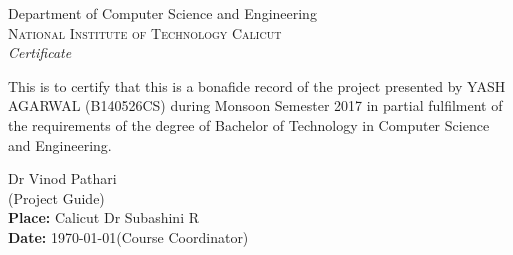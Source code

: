 \newpage
\thispagestyle{empty}

\begin{center}

\huge{Department of Computer Science and Engineering}\\[0.5cm]
\normalsize
\textsc{National Institute of Technology Calicut}\\[2.0cm]

\emph{\LARGE Certificate}\\[2.5cm]
\end{center}
\normalsize This is to certify that this is a bonafide record of the project presented by YASH AGARWAL (B140526CS) during Monsoon Semester 2017 in partial fulfilment of the requirements of the degree of Bachelor of Technology in Computer Science and Engineering.\\[1.0cm]

\begin{flushright}
Dr Vinod Pathari\\
(Project Guide)\\[1.5cm]
\textbf {Place:} Calicut \hfill Dr Subashini R\\
\textbf {Date:} \today \hfill (Course Coordinator)
\end{flushright}